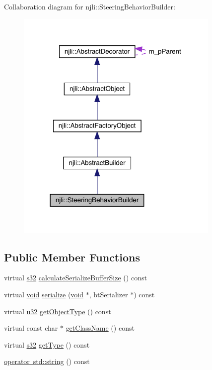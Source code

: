 Collaboration diagram for njli\+:\+:Steering\+Behavior\+Builder\+:\nopagebreak
\begin{figure}[H]
\begin{center}
\leavevmode
\includegraphics[width=278pt]{classnjli_1_1_steering_behavior_builder__coll__graph}
\end{center}
\end{figure}
\subsection*{Public Member Functions}
\begin{DoxyCompactItemize}
\item 
virtual \mbox{\hyperlink{_util_8h_aa62c75d314a0d1f37f79c4b73b2292e2}{s32}} \mbox{\hyperlink{classnjli_1_1_steering_behavior_builder_a4b2f826423e0bc815a6abc923ed66665}{calculate\+Serialize\+Buffer\+Size}} () const
\item 
virtual \mbox{\hyperlink{_thread_8h_af1e856da2e658414cb2456cb6f7ebc66}{void}} \mbox{\hyperlink{classnjli_1_1_steering_behavior_builder_ac94c6252483326df2f7d8a1551159858}{serialize}} (\mbox{\hyperlink{_thread_8h_af1e856da2e658414cb2456cb6f7ebc66}{void}} $\ast$, bt\+Serializer $\ast$) const
\item 
virtual \mbox{\hyperlink{_util_8h_a10e94b422ef0c20dcdec20d31a1f5049}{u32}} \mbox{\hyperlink{classnjli_1_1_steering_behavior_builder_a290dc340ce59ecfb5a0fab8a8d93fb4b}{get\+Object\+Type}} () const
\item 
virtual const char $\ast$ \mbox{\hyperlink{classnjli_1_1_steering_behavior_builder_a647d153d1aa7e81b7e4ee6a2ca55efd1}{get\+Class\+Name}} () const
\item 
virtual \mbox{\hyperlink{_util_8h_aa62c75d314a0d1f37f79c4b73b2292e2}{s32}} \mbox{\hyperlink{classnjli_1_1_steering_behavior_builder_a8c24ce33c8524273aecb7f9a5d34bd61}{get\+Type}} () const
\item 
\mbox{\hyperlink{classnjli_1_1_steering_behavior_builder_a8a67dc1dc042a4a59e899cb5e497425d}{operator std\+::string}} () const
\end{DoxyCompactItemize}
